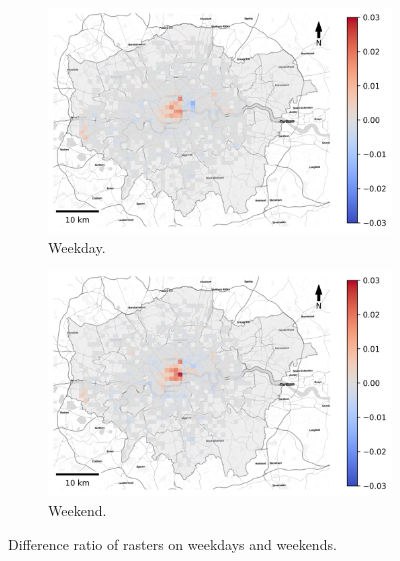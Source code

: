 \documentclass{article}
\theoremstyle{definition}
\theoremstyle{remark}
\begin{document}
\begin{figure}[!h]

\begin{subfigure}{0.5\textwidth}
\includegraphics[width=1\linewidth]{figures/raster_diff_weekday.png} 
\caption{Weekday.}
\label{fig:raster_diff_weekday}
\end{subfigure}
\begin{subfigure}{0.5\textwidth}
\includegraphics[width=1\linewidth]{figures/raster_diff_weekend.png}
\caption{Weekend.}
\label{fig:raster_diff_weekend}
\end{subfigure}

\caption{Difference ratio of rasters on weekdays and weekends.} \label{fig:raster_diff_week}
\end{figure}
\end{document}
